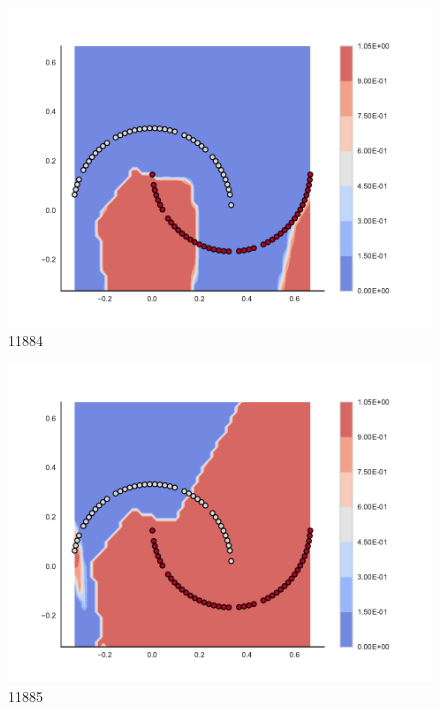 \begin{subfigure}[b]{0.09\textwidth}
    \includegraphics[clip, trim=2.35cm 1.75cm 4.5cm 0cm,width=\textwidth]{img/convergence/11884.pdf}
    \caption{11884}
    \label{fig:convergence_11884}
\end{subfigure}
%
\begin{subfigure}[b]{0.09\textwidth}
    \includegraphics[clip, trim=2.35cm 1.75cm 4.5cm 0cm,width=\textwidth]{img/convergence/11885.pdf}
    \caption{11885}
    \label{fig:convergence_11885}
\end{subfigure}
%
